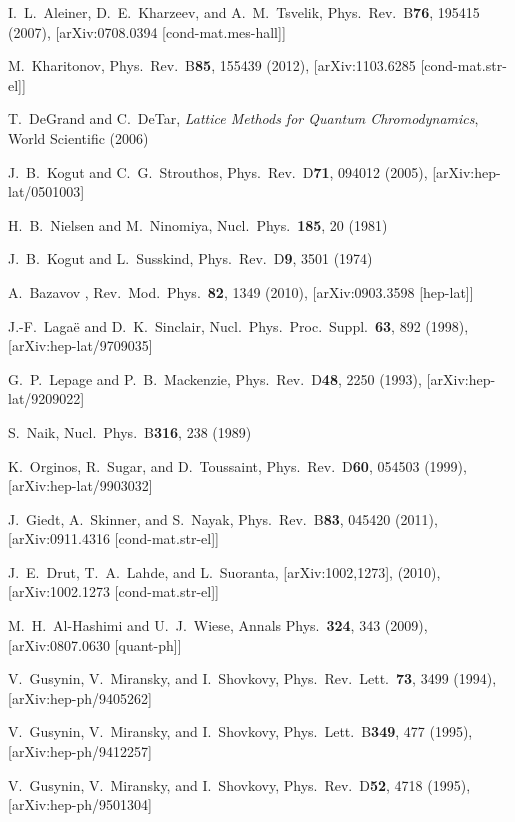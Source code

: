 \documentclass[aps,prd,twocolumn,showpacs,superscriptaddress,groupedaddress]{revtex4}  %
\begin{document}
\begin{thebibliography}{99}
I.~L.~Aleiner, D.~E.~Kharzeev, and A.~M.~Tsvelik, Phys.\ Rev.\ B{\bf 76}, 195415 (2007), [arXiv:0708.0394 [cond-mat.mes-hall]]

M.~Kharitonov, Phys.\ Rev.\ B{\bf 85}, 155439 (2012), [arXiv:1103.6285 [cond-mat.str-el]]

T.~DeGrand and C.~DeTar, {\it Lattice Methods for Quantum Chromodynamics}, World Scientific (2006)

J.~B.~Kogut and C.~G.~Strouthos, Phys.\ Rev.\ D{\bf 71}, 094012 (2005), [arXiv:hep-lat/0501003]

H.~B.~Nielsen and M.~Ninomiya, Nucl.\ Phys.\ {\bf 185}, 20 (1981)

J.~B.~Kogut and L.~Susskind, Phys.\ Rev.\ D{\bf 9}, 3501 (1974)

A.~Bazavov \etal, Rev.\ Mod.\ Phys.\ {\bf 82}, 1349 (2010), [arXiv:0903.3598 [hep-lat]]

J.-F.~Laga\"e and D.~K.~Sinclair, Nucl.\ Phys.\ Proc.\ Suppl.\ {\bf 63}, 892 (1998), [arXiv:hep-lat/9709035]

G.~P.~Lepage and P.~B.~Mackenzie, Phys.\ Rev.\ D{\bf 48}, 2250 (1993), [arXiv:hep-lat/9209022]

S.~Naik, Nucl.\ Phys.\ B{\bf 316}, 238 (1989)

K.~Orginos, R.~Sugar, and D.~Toussaint, Phys.\ Rev.\ D{\bf 60}, 054503 (1999), [arXiv:hep-lat/9903032]

J.~Giedt, A.~Skinner, and S.~Nayak, Phys.\ Rev.\ B{\bf 83}, 045420 (2011), [arXiv:0911.4316 [cond-mat.str-el]]

J.~E.~Drut, T.~A.~Lahde, and L.~Suoranta, [arXiv:1002,1273], (2010), [arXiv:1002.1273 [cond-mat.str-el]]

M.~H.~Al-Hashimi and U.~J.~Wiese, Annals Phys.\ {\bf 324}, 343 (2009), [arXiv:0807.0630 [quant-ph]]

V.~Gusynin, V.~Miransky, and I.~Shovkovy, Phys.\ Rev.\ Lett.\ {\bf 73}, 3499 (1994), [arXiv:hep-ph/9405262]

V.~Gusynin, V.~Miransky, and I.~Shovkovy, Phys.\ Lett.\ B{\bf 349}, 477 (1995), [arXiv:hep-ph/9412257]

V.~Gusynin, V.~Miransky, and I.~Shovkovy, Phys.\ Rev.\ D{\bf 52}, 4718 (1995), [arXiv:hep-ph/9501304]


\end{thebibliography}
\end{document}
